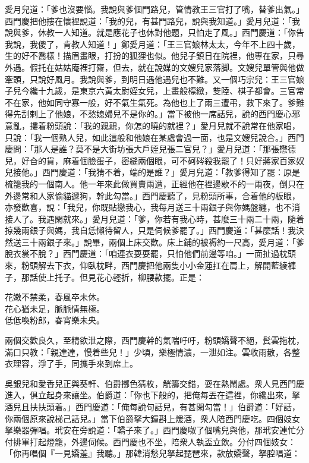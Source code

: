 愛月兒道：「爹也沒要惱。我說與爹個門路兒，管情教王三官打了嘴，替爹出氣。」西門慶把他摟在懷裡說道：「我的兒，有甚門路兒，說與我知道。」愛月兒道：「我說與爹，休教一人知道。就是應花子也休對他題，只怕走了風。」西門慶道：「你告我說，我傻了，肯教人知道！」鄭愛月道：「王三官娘林太太，今年不上四十歲，生的好不喬樣！描眉畫眼，打扮的狐狸也似。{}他兒子鎮日在院裡，他專在家，只尋外遇。假托在姑姑庵裡打齋，但去，就在說媒的文嫂兒家落脚。文嫂兒單管與他做牽頭，只說好風月。我說與爹，到明日遇他遇兒也不難。又一個巧宗兒：王三官娘子兒今纔十九歲，是東京六黃太尉姪女兒，上畫般標緻，雙陸、棋子都會。三官常不在家，他如同守寡一般，好不氣生氣死。為他也上了兩三遭弔，救下來了。爹難得先刮剌上了他娘，不愁媳婦兒不是你的。」{}當下被他一席話兒，說的西門慶心邪意亂，摟着粉頭說：「我的親親，你怎的曉的就裡？」愛月兒就不說常在他家唱，只說：「我一個熟人兒，如此這般和他娘在某處會過一面，也是文嫂兒說合。」西門慶問：「那人是誰？莫不是大街坊張大戶姪兒張二官兒？」{}愛月兒道：「那張懋德兒，好㒲的貨，麻着個臉蛋子，密縫兩個眼，可不砢硶殺我罷了！{}只好蔣家百家奴兒接他。」西門慶道：「我猜不着，端的是誰？」愛月兒道：「教爹得知了罷：原是梳籠我的一個南人。他一年來此做買賣兩遭，正經他在裡邊歇不的一兩夜，倒只在外邊常和人家偷貓遞狗，幹此勾當。」西門慶聽了，見粉頭所事，合着他的板眼，亦發歡喜，說：「我兒，你既貼戀我心，我每月送三十兩銀子與你媽盤纏，也不消接人了。我遇閑就來。」愛月兒道：「爹，你若有我心時，甚麼三十兩二十兩，隨着掠幾兩銀子與媽，我自恁懶待留人，只是伺候爹罷了。」西門慶道：「甚麼話！我決然送三十兩銀子來。」說畢，兩個上床交歡。床上鋪的被褥約一尺高，愛月道：「爹脫衣裳不脫？」西門慶道：「咱連衣耍耍罷，只怕他們前邊等咱。」一面扯過枕頭來，粉頭解去下衣，仰臥枕畔，西門慶把他兩隻小小金蓮扛在肩上，解開藍綾褲子，那話使上托子。但見花心輕折，柳腰款擺。正是：

\begin{myquote} 
花嫩不禁柔，春風卒未休。\\花心猶未足，脈脈情無極。\\低低喚粉郎，春宵樂未央。{}
\end{myquote} 

兩個交歡良久，至精欲泄之際，西門慶幹的氣喘吁吁，粉頭嬌聲不絕，鬂雲拖枕，滿口只教：「親達達，慢着些兒！」少頃，樂極情濃，一泄如注。雲收雨散，各整衣理容，淨了手，同攜手來到席上。

吳銀兒和愛香兒正與葵軒、伯爵擲色猜枚，觥籌交錯，耍在熱鬧處。衆人見西門慶進入，俱立起身來讓坐。伯爵道：「你也下般的，把俺每丟在這裡，你纔出來，拏酒兒且扶扶頭着。」西門慶道：「俺每說句話兒，有甚閑勾當！」伯爵道：「好話，你兩個原來說梯己話兒。」當下伯爵拏大鐘斟上煖酒，衆人陪西門慶吃。四個妓女拏樂器彈唱。玳安在旁說道：「轎子來了。」西門慶呶了個嘴兒與他，那玳安連忙分付排軍打起燈籠，外邊伺候。西門慶也不坐，陪衆人執盃立飲。分付四個妓女：「你再唱個『一見嬌羞』我聽。」那韓消愁兒拏起琵琶來，款放嬌聲，拏腔唱道：


